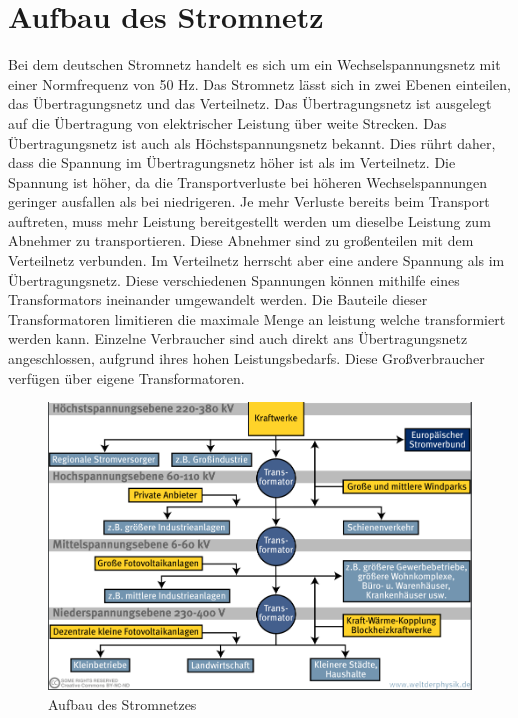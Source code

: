 \section{Aufbau des Stromnetz}
\label{capBack:Stromnetz}
Bei dem deutschen Stromnetz handelt es sich um ein Wechselspannungsnetz mit einer Normfrequenz von 50 Hz. Das Stromnetz lässt sich in zwei Ebenen einteilen, das Übertragungsnetz und das Verteilnetz. Das Übertragungsnetz ist ausgelegt auf die Übertragung von elektrischer Leistung über weite Strecken. Das Übertragungsnetz ist auch als Höchstspannungsnetz bekannt. Dies rührt daher, dass die Spannung im Übertragungsnetz höher ist als im Verteilnetz. Die Spannung ist höher, da die Transportverluste bei höheren Wechselspannungen geringer ausfallen als bei niedrigeren. Je mehr Verluste bereits beim Transport auftreten, muss mehr Leistung bereitgestellt werden um dieselbe Leistung zum Abnehmer zu transportieren. Diese Abnehmer sind zu großenteilen mit dem Verteilnetz verbunden. Im Verteilnetz herrscht aber eine andere Spannung als im Übertragungsnetz. Diese verschiedenen Spannungen können mithilfe eines Transformators ineinander umgewandelt werden. Die Bauteile dieser Transformatoren limitieren die maximale Menge an leistung welche transformiert werden kann. Einzelne Verbraucher sind auch direkt ans Übertragungsnetz angeschlossen, aufgrund ihres hohen Leistungsbedarfs. Diese Großverbraucher verfügen über eigene Transformatoren.
\begin{figure}[h!]
	\includegraphics[width=\linewidth]{img/Stromnetz1.png}
	\caption{Aufbau des Stromnetzes}
	\label{Abb1_Stromnetz}
\end{figure}


